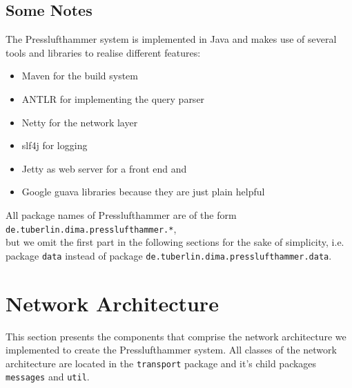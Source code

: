 \subsection{Some Notes}
The Presslufthammer system is implemented in Java and makes use of several tools
and libraries to realise different features:

\begin{itemize}
  \item Maven \cite{maven} for the build system
  \item ANTLR \cite{antlr} for implementing the query parser
  \item Netty \cite{netty} for the network layer
  \item slf4j \cite{slf4j} for logging
  \item Jetty \cite{jetty} as web server for a front end and
  \item Google guava libraries \cite{guava} because they are just plain helpful
\end{itemize}

All package names of Presslufthammer are of the form\\
\texttt{de.tuberlin.dima.presslufthammer.*},\\
but we omit the first part in the following sections for the sake of simplicity,
i.e. package \texttt{data} instead of package
\texttt{de.tuberlin.dima.presslufthammer.data}.

\section{Network Architecture}
  This section presents the components that comprise the network architecture
  we implemented to create the Presslufthammer system.
  All classes of the network architecture are located in the \texttt{transport}
  package and it's child packages \texttt{messages} and \texttt{util}.
  
  

